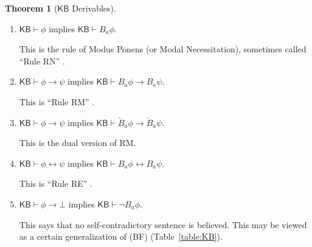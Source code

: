 \documentclass[12pt]{article}
\theoremstyle{definition}
\newtheorem{theorem}{Theorem}[section]
\newcommand{\KB}{{\mathsf{KB}}}                        %
\begin{document}
\begin{theorem}[$\KB$ Derivables]
\begin{enumerate}
  \item $\KB\vdash\phi$ implies $\KB\vdash B_a\phi$.
    \label{derivables:B-nec}

    This is the rule of Modus Ponens (or Modal Necessitation),
    sometimes called ``Rule RN'' \cite[Ch.~8]{Chellas:ml}.

  \item $\KB\vdash\phi\to\psi$ implies $\KB\vdash B_a\phi\to B_a\psi$.
    \label{derivables:Bimp}

    This is ``Rule RM'' \cite[Ch.~8]{Chellas:ml}.

  \item $\KB\vdash\phi\to\psi$ implies $\KB\vdash\check
    B_a\phi\to\check B_a\psi$.
    \label{derivables:check-Bimp}
    
    This is the dual version of RM.
    
  \item $\KB\vdash\phi\leftrightarrow\psi$ implies
    $\KB\vdash B_a\phi\leftrightarrow B_a\psi$.
    \label{derivables:RE}

    This is ``Rule RE'' \cite[Ch.~8]{Chellas:ml}.

  \item $\KB\vdash\phi\to\bot$ implies $\KB\vdash\lnot
    B_a\phi$. \label{derivables:GBF}

    This says that no self-contradictory sentence is believed.  This
    may be viewed as a certain generalization of (BF)
    (Table~\ref{table:KB}).
  \end{enumerate}
\end{theorem}
\end{document}
